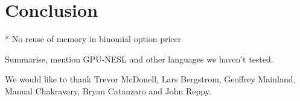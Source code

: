\documentclass[preprint]{sigplanconf}
\begin{document}
\section{Conclusion}
* No reuse of memory in binomial option pricer

Summarise, mention GPU-NESL and other languages we haven't tested.

\acks 

We would like to thank Trevor McDonell, Lars Bergstrom, Geoffrey
Mainland, Manual Chakravary, Bryan Catanzaro and John Reppy.





\end{document}
